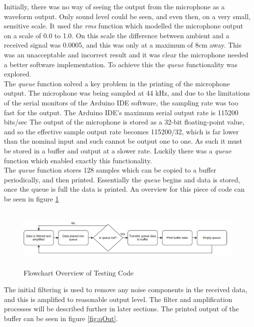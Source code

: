 Initially, there was no way of seeing the output from the microphone as a waveform output. Only sound level could be seen, and even then, on a very small, sensitive scale. It used the \textit{rms }function which modelled the microphone output on a scale of 0.0 to 1.0. On this scale the difference between ambient and a received signal was 0.0005, and this was only at a maximum of 8cm away. This was an unacceptable and incorrect result and it was clear the microphone needed a better software implementation. To achieve this the \textit{queue }functionality was explored. \\

The \textit{queue }function solved a key problem in the printing of the microphone output. The microphone was being sampled at 44 kHz, and due to the limitations of the serial monitors of the Arduino IDE software, the sampling rate was too fast for the output. The Arduino IDE’s maximum serial output rate is 115200 bits/sec \cite{arduino}The output of the microphone is stored as a 32-bit floating-point value, and so the effective sample output rate becomes 115200/32, which is far lower than the nominal input and such cannot be output one to one. As such it must be stored in a buffer and output at a slower rate. Luckily there was a \textit{queue} function which enabled exactly this functionality. \\

The \textit{queue} function stores 128 samples which can be copied to a buffer periodically, and then printed. Essentially the \textit{queue} begins and data is stored, once the queue is full the data is printed. An overview for this piece of code can be seen in figure \ref{fig:qFlow} 

\begin{figure}[H]
\centering
\noindent\includegraphics[width=18cm,height=3.0cm]{./images/queueFlowH.png}
\caption{Flowchart Overview of Testing Code}
\label{fig:qFlow}
\end{figure}

The initial filtering is used to remove any noise components in the received data, and this is amplified to reasonable output level. The filter and amplification processes will be described further in later sections. The printed output of the buffer can be seen in figure \ref{fig:qOut}. 

